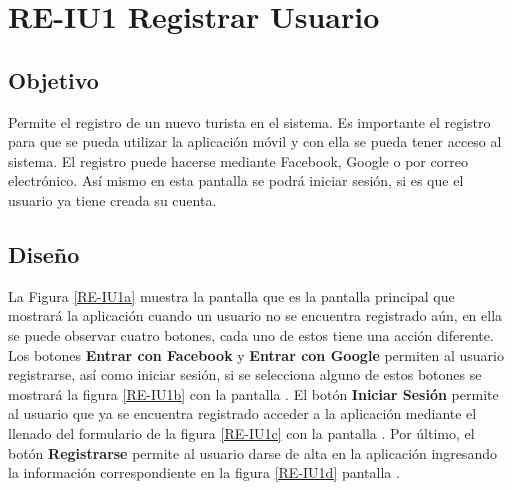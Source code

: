 \newpage
\section{RE-IU1 Registrar Usuario}

\subsection{Objetivo}
Permite el registro de un nuevo turista en el sistema. Es importante el registro para que se pueda utilizar la aplicación móvil y con ella se pueda tener acceso al sistema. El registro puede hacerse mediante Facebook, Google o por correo electrónico. Así mismo en esta pantalla se podrá iniciar sesión, si es que el usuario ya tiene creada su cuenta.

\subsection{Diseño}
La Figura \ref{RE-IU1a} muestra la pantalla  que es la pantalla principal que mostrará la aplicación cuando un usuario no se encuentra registrado aún, en ella se puede observar cuatro botones, cada uno de estos tiene una acción diferente. Los botones \textbf{Entrar con Facebook} y \textbf{Entrar con Google} permiten al usuario registrarse, así como iniciar sesión, si se selecciona alguno de estos botones se mostrará la figura \ref{RE-IU1b} con la pantalla . El botón \textbf{Iniciar Sesión} permite al usuario que ya se encuentra registrado acceder a la aplicación mediante el llenado del formulario de la figura \ref{RE-IU1c} con la pantalla . Por último, el botón \textbf{Registrarse} permite al usuario darse de alta en la aplicación ingresando la información correspondiente en la figura \ref{RE-IU1d} pantalla .





